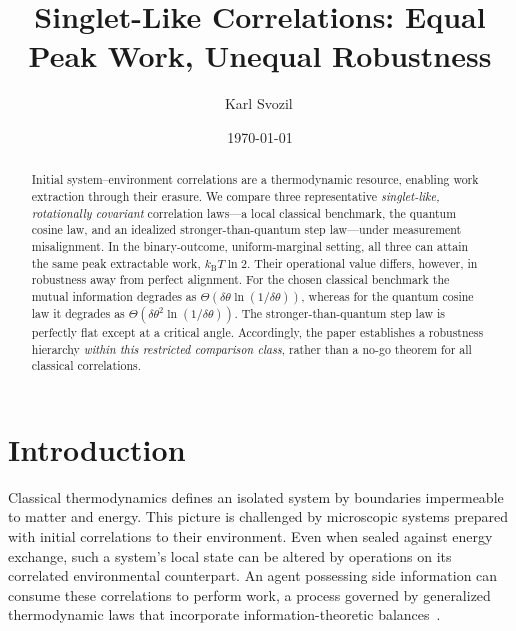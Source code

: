 \documentclass[pra,twocolumn,showpacs,preprintnumbers,amsmath,amssymb,longbibliography,
               superscriptaddress]{revtex4-2}
\begin{document}
\title{{Singlet-Like Correlations: Equal Peak Work, Unequal Robustness}}

\author{Karl Svozil\,}

\date{\today}

\begin{abstract}
{Initial system--environment correlations are a thermodynamic resource, enabling work extraction through their erasure. We compare three representative \emph{singlet-like, rotationally covariant} correlation laws---a local classical benchmark, the quantum cosine law, and an idealized stronger-than-quantum step law---under measurement misalignment. In the binary-outcome, uniform-marginal setting, all three can attain the same peak extractable work, $k_{\mathrm B}T\ln 2$. Their operational value differs, however, in robustness away from perfect alignment. For the chosen classical benchmark the mutual information degrades as $\Theta(\delta\theta\ln(1/\delta\theta))$, whereas for the quantum cosine  law it degrades as $\Theta(\delta\theta^2\ln(1/\delta\theta))$. The stronger-than-quantum step law is perfectly flat except at a critical angle. Accordingly, the paper establishes a robustness hierarchy \emph{within this restricted comparison class}, rather than a no-go theorem for all classical correlations.}
\end{abstract}

\maketitle

\section{{Introduction}}

Classical thermodynamics defines an isolated system by boundaries
impermeable to matter and energy.
This picture is challenged by microscopic systems prepared with initial
correlations to their environment.
Even when sealed against energy exchange, such a system's local state
can be altered by operations on its correlated environmental
counterpart.
An agent possessing side information can consume these correlations to
perform work, a process governed by generalized thermodynamic laws that
incorporate information-theoretic
balances~\cite{Bera2017a,delrio2011thermodynamic,Sagawa2012}.
\end{document}
